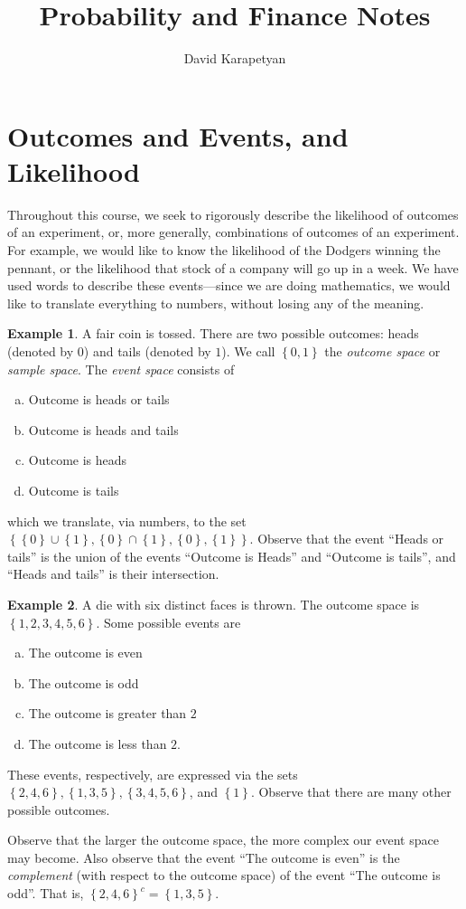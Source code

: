 \documentclass[12pt]{article}
\theoremstyle{plain}
\theoremstyle{definition}
\newtheorem*{example}{Example}
\theoremstyle{remark}
\numberwithin{equation}{section}  %
\begin{document}
\title{Probability and Finance Notes}
\author{David Karapetyan}
\date{}
\maketitle
\newpage
\setcounter{tocdepth}{2}
\setcounter{secnumdepth}{2}
\tableofcontents
\newpage
\section{Outcomes and Events, and Likelihood}
Throughout this course, we seek to rigorously describe the likelihood of
outcomes of an experiment, or, more generally, combinations of outcomes of an 
experiment.
For example, we would like to know the likelihood of the Dodgers
winning the pennant, or the likelihood that stock of a company will go up
in a week. We have used words to describe these events---since we are doing
mathematics, we would like to translate everything to numbers, without losing
any of the meaning.
\begin{example}
	A fair coin is tossed. There are two possible outcomes: heads (denoted by 
	$0$) 
	and tails (denoted by $1$). We call $ \left\{ 0,1 \right\} $ the 
	\emph{outcome
	space} or \emph{sample space}. The \emph{event space} consists of
	\begin{enumerate}[(a)]
		\item Outcome is heads or tails
		\item Outcome is heads and tails
		\item Outcome is heads
		\item Outcome is tails
	\end{enumerate}
	which we translate, via numbers, to the set $ \left\{ \left\{ 0 \right\} 
		\cup
		\left\{ 1 \right\}, \left\{ 0 \right\} \cap \left\{ 1 \right\} , \left\{ 0
	\right\} , \left\{ 1 \right\} \right \}$.
	Observe that the event ``Heads or tails'' is the union of the events
	``Outcome is Heads'' and ``Outcome is tails'', and ``Heads and tails'' is
	their intersection.
\end{example}	

\begin{example}
	A die with six distinct faces is thrown. The outcome space is
	$ \left\{ 1, 2, 3, 4, 5, 6 \right\} $. Some possible events are
	\begin{enumerate}[(a)]
		\item The outcome is even
		\item The outcome is odd
		\item The outcome is greater than $2$
		\item The outcome is less than $2$.
	\end{enumerate}
	These events, respectively, are expressed via the sets
	$ \left\{ 2, 4, 6 \right\} , \left\{ 1,3,5 \right\} , \left\{ 3, 4, 5, 6
	\right\}$, and $\left\{ 1 \right\}$.
	Observe that there are many other possible outcomes.
\end{example}
Observe that the larger the outcome space, the more complex
our event space may become. Also observe that the event
``The outcome is even'' is the \emph{complement} (with respect to the
outcome space) of
the event ``The outcome is odd''. That is,
${\left\{ 2,4,6 \right\}}^c
= \left\{ 1,3,5 \right\}$.
\end{document}
